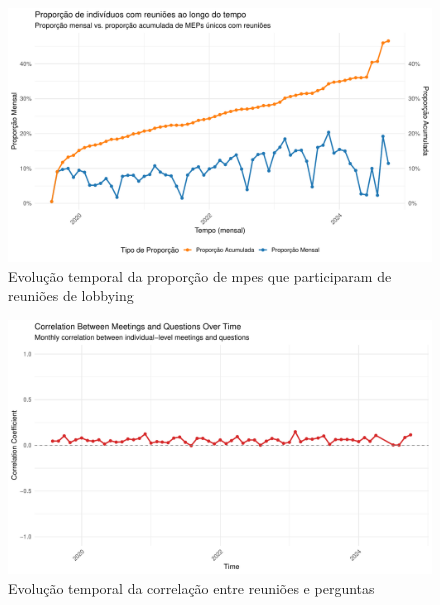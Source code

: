 \begin{figure}[htbp]
    \centering
    \includegraphics[width=\textwidth]{figures/fig2_proportion_meetings.pdf}
    \caption{Evolução temporal da proporção de \acrshort{mpe}s que participaram de reuniões de lobbying}
    \label{fig:proportion_meetings}
\end{figure}

\begin{figure}[htbp]
    \centering
    \includegraphics[width=\textwidth]{figures/fig3_correlation_meetings_questions.pdf}
    \caption{Evolução temporal da correlação entre reuniões e perguntas}
    \label{fig:correlation_meetings_questions}
\end{figure}

